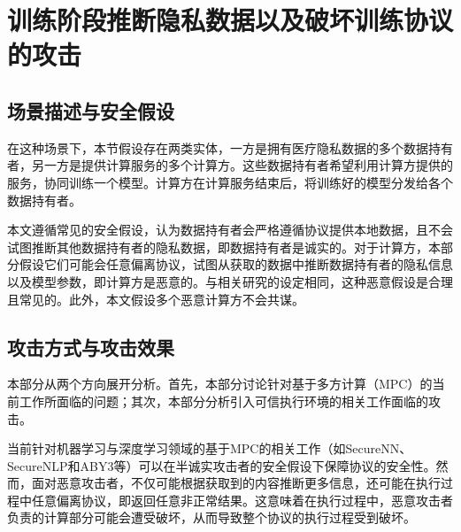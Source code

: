 \section{训练阶段推断隐私数据以及破坏训练协议的攻击}


\subsection{场景描述与安全假设}


%

在这种场景下，本节假设存在两类实体，一方是拥有医疗隐私数据的多个数据持有者，另一方是提供计算服务的多个计算方。这些数据持有者希望利用计算方提供的服务，协同训练一个模型。计算方在计算服务结束后，将训练好的模型分发给各个数据持有者。

本文遵循常见的安全假设\cite{SecureNN, SecureNLP}，认为数据持有者会严格遵循协议提供本地数据，且不会试图推断其他数据持有者的隐私数据，即数据持有者是诚实的。对于计算方，本部分假设它们可能会任意偏离协议，试图从获取的数据中推断数据持有者的隐私信息以及模型参数，即计算方是恶意的。与相关研究\cite{Cryptflow}的设定相同，这种恶意假设是合理且常见的。此外，本文假设多个恶意计算方不会共谋。

\subsection{攻击方式与攻击效果}

本部分从两个方向展开分析。首先，本部分讨论针对基于多方计算（MPC）的当前工作所面临的问题；其次，本部分分析引入可信执行环境的相关工作面临的攻击。

当前针对机器学习与深度学习领域的基于MPC的相关工作（如SecureNN\cite{SecureNN}、SecureNLP\cite{SecureNLP}和ABY3\cite{aby3}等）可以在半诚实攻击者的安全假设下保障协议的安全性。然而，面对恶意攻击者，不仅可能根据获取到的内容推断更多信息，还可能在执行过程中任意偏离协议，即返回任意非正常结果\cite{Cryptflow}。这意味着在执行过程中，恶意攻击者负责的计算部分可能会遭受破坏，从而导致整个协议的执行过程受到破坏。

